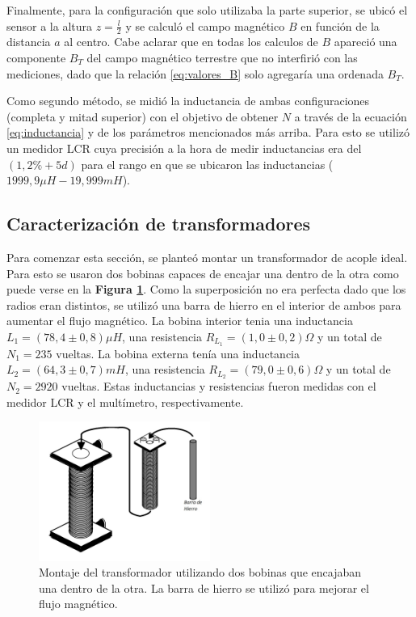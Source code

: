 \documentclass[11pt,a4paper]{article}
\begin{document}
Finalmente, para la configuración que solo utilizaba la parte superior, se ubicó el sensor a la altura $z = \frac{l}{2}$ y se calculó el campo magnético $B$ en función de la distancia $a$ al centro. Cabe aclarar que en todas los calculos de $B$ apareció una componente $B_{T}$ del campo magnético terrestre que no interfirió con las mediciones, dado que la relación \eqref{eq:valores_B} solo agregaría una ordenada $B_T$.

Como segundo método, se midió la inductancia de ambas configuraciones (completa y mitad superior) con el objetivo de obtener $N$ a través de la ecuación \eqref{eq:inductancia} y de los parámetros mencionados más arriba. Para esto se utilizó un medidor LCR cuya precisión a la hora de medir inductancias era del $(1,2\%+5d)$ para el rango en que se ubicaron las inductancias ($1999,9\mu H-19,999mH$).


\subsection{Caracterización de transformadores}

Para comenzar esta sección, se planteó montar un transformador de acople ideal. Para esto se usaron dos bobinas capaces de encajar una dentro de la otra como puede verse en la \textbf{Figura \ref{fig:transmont}}. Como la superposición no era perfecta dado que los radios eran distintos, se utilizó una barra de hierro en el interior de ambos para aumentar el flujo magnético. La bobina interior tenia una inductancia $L_1 = (78,4 \pm 0,8)\mu H$, una resistencia $R_{L_1}=(1,0 \pm 0,2)\Omega$ y un total de $N_1=235$ vueltas. La bobina externa tenía una inductancia $L_2 = (64,3 \pm 0,7)mH$, una resistencia $R_{L_2}=(79,0 \pm 0,6)\Omega$ y un total de $N_2=2920$ vueltas. Estas inductancias y resistencias fueron medidas con el medidor LCR y el multímetro, respectivamente.

\begin{figure}[h!]
\centering
   \includegraphics[width=0.5\textwidth]{Transformadores1}
   \caption{Montaje del transformador utilizando dos bobinas que encajaban una dentro de la otra. La barra de hierro se utilizó para mejorar el flujo magnético.}  
   \label{fig:transmont}
\end{figure}
\end{document}
